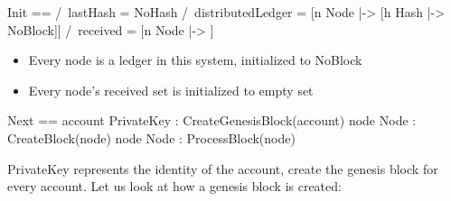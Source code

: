 \documentclass{report}
\begin{document}
\begin{tla}
Init ==
    /\ lastHash = NoHash
    /\ distributedLedger = [n \in Node |-> [h \in Hash |-> NoBlock]]
    /\ received = [n \in Node |-> {}]
\end{tla}
\begin{tlatex}
%
%
%
\end{tlatex}

\begin{itemize}
    \item Every node is a ledger in this system, initialized to NoBlock
    \item Every node's received set is initialized to empty set
\end{itemize}

\begin{tla}
Next ==
    \/ \E account \in PrivateKey : CreateGenesisBlock(account)
    \/ \E node \in Node : CreateBlock(node)
    \/ \E node \in Node : ProcessBlock(node)
\end{tla}
\begin{tlatex}
%
%
%
\end{tlatex}
\newline

PrivateKey represents the identity of the account, create the genesis block for
every account. Let us look at how a genesis block is created:\newline
\end{document}
